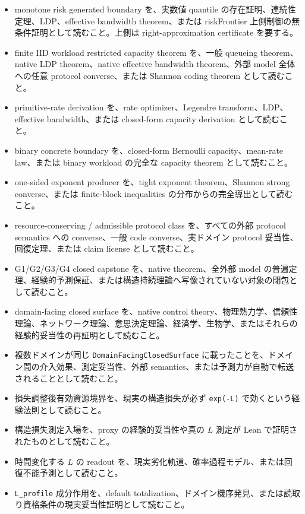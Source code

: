 \documentclass[12pt,a4paper]{article}
\begin{document}
\begin{itemize}
\item
  monotone risk generated boundary を、実数値 quantile の存在証明、連続性定理、LDP、effective bandwidth theorem、または riskFrontier 上側制御の無条件証明として読むこと。上側は right-approximation certificate を要する。
\item
  finite IID workload restricted capacity theorem を、一般 queueing theorem、native LDP theorem、native effective bandwidth theorem、外部 model 全体への任意 protocol converse、または Shannon coding theorem として読むこと。
\item
  primitive-rate derivation を、rate optimizer、Legendre transform、LDP、effective bandwidth、または closed-form capacity derivation として読むこと。
\item
  binary concrete boundary を、closed-form Bernoulli capacity、mean-rate law、または binary workload の完全な capacity theorem として読むこと。
\item
  one-sided exponent producer を、tight exponent theorem、Shannon strong converse、または finite-block inequalities の分布からの完全導出として読むこと。
\item
  resource-conserving / admissible protocol class を、すべての外部 protocol semantics への converse、一般 code converse、実ドメイン protocol 妥当性、回復定理、または claim license として読むこと。
\item
  G1/G2/G3/G4 closed capstone を、native theorem、全外部 model の普遍定理、経験的予測保証、または構造持続理論へ写像されていない対象の閉包として読むこと。
\item
  domain-facing closed surface を、native control theory、物理熱力学、信頼性理論、ネットワーク理論、意思決定理論、経済学、生物学、またはそれらの経験的妥当性の再証明として読むこと。
\item
  複数ドメインが同じ \texttt{DomainFacingClosedSurface} に載ったことを、ドメイン間の介入効果、測定妥当性、外部 semantics、または予測力が自動で転送されることとして読むこと。
\item
  損失調整後有効資源境界を、現実の構造損失が必ず \texttt{exp(-L)} で効くという経験法則として読むこと。
\item
  構造損失測定入場を、proxy の経験的妥当性や真の \(L\) 測定が Lean で証明されたものとして読むこと。
\item
  時間変化する \(L\) の readout を、現実劣化軌道、確率過程モデル、または回復不能予測として読むこと。
\item
  \texttt{L\_profile} 成分作用を、default totalization、ドメイン機序発見、または読取り資格条件の現実妥当性証明として読むこと。
\end{itemize}
\end{document}

